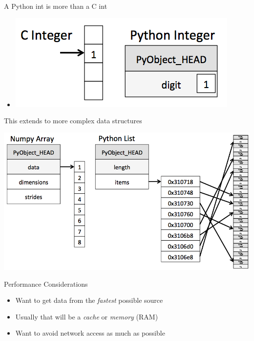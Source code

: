 \documentclass[12pt, aspectration=169]{beamer}
\begin{document}
    \begin{frame}{A Python int is more than a C int}
        \begin{itemize}
            \item[] \begin{center}
                  \includegraphics[scale=0.5]{static/images/cint_vs_pyint}
            \end{center}
        \end{itemize}
    \end{frame}

    \begin{frame}{This extends to more complex data structures}
        \begin{center}
              \includegraphics[scale=0.25]{static/images/array_vs_list}
        \end{center}
    \end{frame}

    \begin{frame}{Performance Considerations}
        \begin{itemize}
            \item Want to get data from the \textit{fastest} possible source
            \item Usually that will be a \textit{cache} or \textit{memory} (RAM)
            \item Want to avoid network access as much as possible
        \end{itemize}
    \end{frame}
\end{document}
